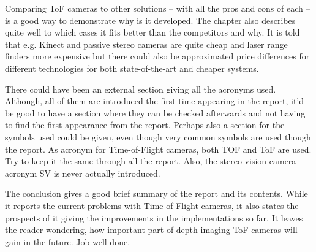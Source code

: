 \documentclass[a4paper,english,12pt]{article}
\begin{document}
Comparing ToF cameras to other solutions -- with all the pros and cons of each -- is a good way to demonstrate why is it developed. The chapter also describes quite well to which cases it fits better than the competitors and why. It is told that e.g. Kinect and passive stereo cameras are quite cheap and laser range finders more expensive but there could also be approximated price differences for different technologies for both state-of-the-art and cheaper systems.

There could have been an external section giving all the acronyms used. Although, all of them are introduced the first time appearing in the report, it'd be good to have a section where they can be checked afterwards and not having to find the first appearance from the report. Perhaps also a section for the symbols used could be given, even though very common symbols are used though the report. As acronym for Time-of-Flight cameras, both TOF and ToF are used. Try to keep it the same through all the report. Also, the stereo vision camera acronym SV is never actually introduced.

The conclusion gives a good brief summary of the report and its contents. While it reports the current problems with Time-of-Flight cameras, it also states the prospects of it giving the improvements in the implementations so far. It leaves the reader wondering, how important part of depth imaging ToF cameras will gain in the future. Job well done.
\end{document}
